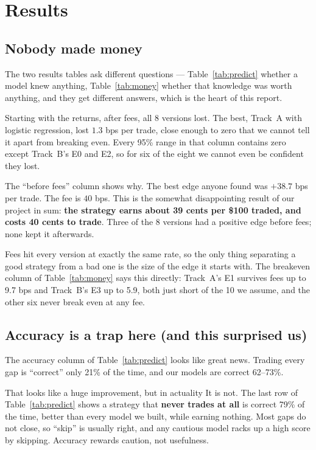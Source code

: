 \documentclass[10pt]{article}
\begin{document}
\section{Results}

\subsection{Nobody made money}

The two results tables ask different questions --- Table~\ref{tab:predict}
whether a model knew anything, Table~\ref{tab:money} whether that
knowledge was worth anything, and they get different answers, which is
the heart of this report.

Starting with the returns, after fees, all 8 versions lost. The best, Track~A with
logistic regression, lost $1.3$ bps per trade, close enough to zero that we
cannot tell it apart from breaking even. Every 95\% range in that column contains
zero except Track~B's E0 and E2, so for six of the eight we cannot even be
confident they lost.

The ``before fees'' column shows why. The best edge anyone found was $+38.7$ bps per
trade. The fee is $40$ bps. This is the somewhat disappointing result of our project in sum: \textbf{the strategy earns about 39 cents per \$100 traded, and costs 40
cents to trade}. Three of the 8 versions had a positive edge before fees; none
kept it afterwards.

Fees hit every version at exactly the same rate, so the only thing separating a
good strategy from a bad one is the size of the edge it starts with. The
breakeven column of Table~\ref{tab:money} says this directly: Track~A's E1
survives fees up to 9.7 bps and Track~B's E3 up to 5.9, both just short of the 10
we assume, and the other six never break even at any fee.

\subsection{Accuracy is a trap here (and this surprised us)}

The accuracy column of Table~\ref{tab:predict} looks like great news. Trading every gap is ``correct'' only
21\% of the time, and our models are correct 62--73\%.

That looks like a huge improvement, but in actuality It is not. The last row of Table~\ref{tab:predict} shows a strategy that
\textbf{never trades at all} is correct 79\% of the time, better than every
model we built, while earning nothing. Most gaps do not close, so ``skip'' is
usually right, and any cautious model racks up a high score by skipping. Accuracy
rewards caution, not usefulness.
\end{document}
